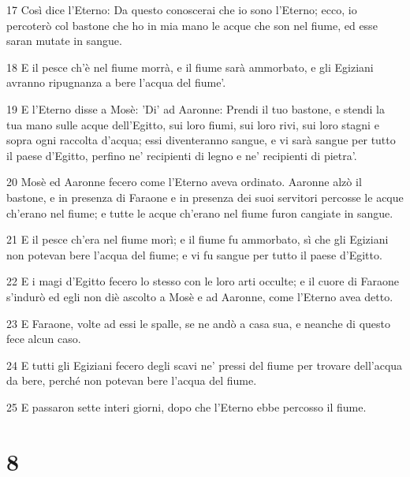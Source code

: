 \par 17 Così dice l'Eterno: Da questo conoscerai che io sono l'Eterno; ecco, io percoterò col bastone che ho in mia mano le acque che son nel fiume, ed esse saran mutate in sangue.
\par 18 E il pesce ch'è nel fiume morrà, e il fiume sarà ammorbato, e gli Egiziani avranno ripugnanza a bere l'acqua del fiume'.
\par 19 E l'Eterno disse a Mosè: 'Di' ad Aaronne: Prendi il tuo bastone, e stendi la tua mano sulle acque dell'Egitto, sui loro fiumi, sui loro rivi, sui loro stagni e sopra ogni raccolta d'acqua; essi diventeranno sangue, e vi sarà sangue per tutto il paese d'Egitto, perfino ne' recipienti di legno e ne' recipienti di pietra'.
\par 20 Mosè ed Aaronne fecero come l'Eterno aveva ordinato. Aaronne alzò il bastone, e in presenza di Faraone e in presenza dei suoi servitori percosse le acque ch'erano nel fiume; e tutte le acque ch'erano nel fiume furon cangiate in sangue.
\par 21 E il pesce ch'era nel fiume morì; e il fiume fu ammorbato, sì che gli Egiziani non potevan bere l'acqua del fiume; e vi fu sangue per tutto il paese d'Egitto.
\par 22 E i magi d'Egitto fecero lo stesso con le loro arti occulte; e il cuore di Faraone s'indurò ed egli non diè ascolto a Mosè e ad Aaronne, come l'Eterno avea detto.
\par 23 E Faraone, volte ad essi le spalle, se ne andò a casa sua, e neanche di questo fece alcun caso.
\par 24 E tutti gli Egiziani fecero degli scavi ne' pressi del fiume per trovare dell'acqua da bere, perché non potevan bere l'acqua del fiume.
\par 25 E passaron sette interi giorni, dopo che l'Eterno ebbe percosso il fiume.

\chapter{8}

